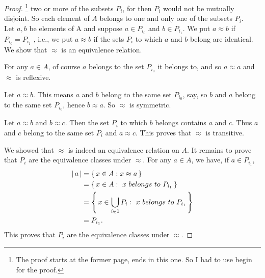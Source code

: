 \documentclass[11pt]{amsbook}
\begin{document}
    \begin{proof}\footnote{The proof starts at the former page, ends in this one. So I had to use begin for the proof.}
    two or more of the subsets $P_{i}$, for then $P_{i}$ would not be mutually disjoint.
    So each element of $A$ belongs to one and only one of the subsets $P_{i}$.\\
    Let $a,b$ be elements of A and suppose $a \in P_{i_{0}}$ and $b \in P_{i_{1}}$. We put $a \approx b$ if $ P_{i_{0}} = P_{i_{1}}$
    , i.e., we put $a\approx b$ if the sets $P_{i}$ to which $a$ and $b$ belong are identical. We show that $\approx$ is an equivalence relation.
    \begin{hEnumerateRoman}
        \item For any $a\in A$, of course $a$ belongs to the set $P_{i_{0}}$ it belongs to, and so $a\approx a$ and $\approx$ is reflexive. 
        \item Let $a \approx b$. This means $a$ and $b$ belong to the same set $P_{i_{0}}$, say, so $b$ and $a$ belong to the same set $P_{i_{0}}$, hence $b \approx a$. So $\approx$ is symmetric.
        \item Let $a\approx b$ and $b\approx c$. Then the set $P_{i}$ to which $b$ belongs contains $a$ and $c$. Thus $a$ and $c$ belong to the same set $P_{i}$ and $a\approx c$. This proves that $\approx$ is transitive.\\
    \end{hEnumerateRoman}
    We showed that $\approx$ is indeed an equivalence relation on $A$. It remains to prove that $P_{i}$ are the equivalence classes under $\approx$. For any $a\in A$, we have, if $a\in P_{i_{1}}$,
    \begin{align*}
        \hAbs{a}&=\hPairingCurly{x\in A : x\approx a}\\
        &=\hPairingCurly{x\in A :\ x\ belongs\ to\ P_{i_{1}}}\\
        &=\hPairingCurly{x\in \bigcup_{\substack{i\in 1}} P_{i} :\ x\ belongs\ to\ P_{i_{1}}}\\
        &=P_{i_{1}}.\\
    \end{align*}
    This proves that $P_{i}$ are the equivalence classes under $\approx$.
    \end{proof}
\end{document}
